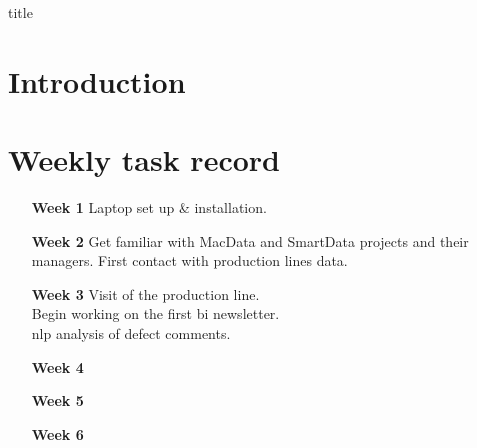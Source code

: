 \documentclass[12pt]{book}
\begin{document}
{title}

\tableofcontents


\chapter{Introduction}


\appendix
\chapter{Weekly task record}
\begin{itemize}
    \item [\textbf{Week 1}] Laptop set up \& installation.
    \item [\textbf{Week 2}]
          Get familiar with MacData and SmartData projects and their managers.
          First contact with production lines data.
    \item [\textbf{Week 3}]
          Visit of the production line. \\
          Begin working on the first \gls{bi} newsletter. \\
          \gls{nlp} analysis of defect comments.
    \item [\textbf{Week 4}]
    \item [\textbf{Week 5}]
    \item [\textbf{Week 6}]
\end{itemize}


\end{document}
